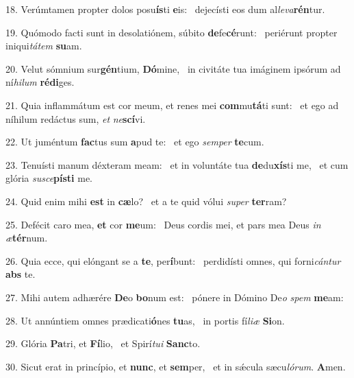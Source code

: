 18. Verúmtamen propter dolos posu\textbf{ís}ti \textbf{e}is: \ast\  dejecísti eos dum al\textit{le}\textit{va}\textbf{rén}tur.\

19. Quómodo facti sunt in desolatiónem, súbito \textbf{de}fe\textbf{cé}runt: \ast\  periérunt propter iniqui\textit{tá}\textit{tem} \textbf{su}am.\

20. Velut sómnium sur\textbf{gén}tium, \textbf{Dó}mine, \ast\  in civitáte tua imáginem ipsórum ad ní\textit{hi}\textit{lum} \textbf{réd}\textbf{i}ges.\

21. Quia inflammátum est cor meum, et renes mei \textbf{com}mu\textbf{tá}ti sunt: \ast\  et ego ad níhilum redáctus sum, \textit{et} \textit{ne}\textbf{scí}vi.\

22. Ut juméntum \textbf{fac}tus sum \textbf{a}pud te: \ast\  et ego \textit{sem}\textit{per} \textbf{te}cum.\

23. Tenuísti manum déxteram meam: \dag\  et in voluntáte tua \textbf{de}du\textbf{xís}ti me, \ast\  et cum glória \textit{su}\textit{sce}\textbf{pís}\textbf{ti} me.\

24. Quid enim mihi \textbf{est} in \textbf{cæ}lo? \ast\  et a te quid vólui \textit{su}\textit{per} \textbf{ter}ram?\

25. Defécit caro mea, \textbf{et} cor \textbf{me}um: \ast\  Deus cordis mei, et pars mea Deus \textit{in} \textit{æ}\textbf{tér}num.\

26. Quia ecce, qui elóngant se a \textbf{te}, per\textbf{í}bunt: \ast\  perdidísti omnes, qui forni\textit{cán}\textit{tur} \textbf{abs} te.\

27. Mihi autem adhærére \textbf{De}o \textbf{bo}num est: \ast\  pónere in Dómino De\textit{o} \textit{spem} \textbf{me}am:\

28. Ut annúntiem omnes prædicati\textbf{ó}nes \textbf{tu}as, \ast\  in portis fí\textit{li}\textit{æ} \textbf{Si}on.\

29. Glória \textbf{Pa}tri, et \textbf{Fí}lio, \ast\  et Spirí\textit{tu}\textit{i} \textbf{Sanc}to.\

30. Sicut erat in princípio, et \textbf{nunc}, et \textbf{sem}per, \ast\  et in sǽcula sæcu\textit{ló}\textit{rum}. \textbf{A}men.\

